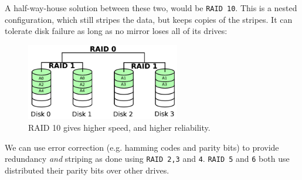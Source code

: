 A half-way-house solution between these two, would be \texttt{RAID 10}. This is
a nested configuration, which still stripes the data, but keeps copies of the
stripes. It can tolerate disk failure as long as no mirror loses all of its
drives:

\begin{figure}[H]
  \centering
  \includegraphics[width=0.6\textwidth]{images/raid10}
  \caption{RAID 10 gives higher speed, and higher reliability.}
  \label{raid10}
\end{figure}  


We can use error correction (e.g. hamming codes and parity bits) to provide
redundancy \textit{and} striping as done using \texttt{RAID 2,3} and \texttt{4}.
\texttt{RAID 5} and \texttt{6} both use distributed their parity bits over other
drives.

